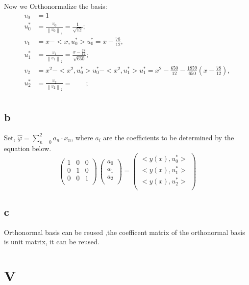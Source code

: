 \documentclass[a4paper]{article}
\begin{document}
Now we Orthonormalize the basis:
\begin{align}
    v_{0} &= 1 \\
    u_{0}^{*} &= \frac{v_{0}}{\left\lVert v_{0}\right\rVert _{2}} = \frac{1}{\sqrt{12}} ; \\
    v_{1} &= x - <x, u_{0}^{*}>u_{0}^{*} = x - \frac{78}{12} ,\\
    u_{1}^{*} &= \frac{v_{1}}{ \left\lVert v_{1}\right\rVert _{2} } = \frac{x - \frac{78}{12}}{\sqrt{650}};\\
    v_{2} &= x^{2} - <x^{2}, u_{0}^{*}>u_{0}^{*} - <x^{2}, u_{1}^{*}>u_{1}^{*} = x^{2} - \frac{650}{12} -\frac{1859}{650}(x - \frac{78}{12}),\\
    u_{2}^{*} &= \frac{v_{2}}{\left\lVert v_{2}\right\rVert _{2}} =  \qquad;\\
\end{align}

\subsection*{b}

Set, $ \widehat{\varphi} = \sum_{n = 0}^{2} a_{n}\cdot x_{n} $, where $a_{i}$ are the coefficients to be determined by the equation below.
$$
\begin{pmatrix}
1 & 0 & 0 \\
0 & 1 & 0 \\
0 & 0 & 1 \\
\end{pmatrix}\,
\begin{pmatrix}
a_{0} \\
a_{1} \\
a_{2} \\
\end{pmatrix}
= \begin{pmatrix}
<y(x),u_{0}^{*}> \\
<y(x),u_{1}^{*}> \\
<y(x),u_{2}^{*}> \\
\end{pmatrix}
$$

\subsection*{c}
Orthonormal basis can be reused ,the coefficent matrix of the orthonormal basis is unit matrix, it can be reused.


\section*{V}
\end{document}
